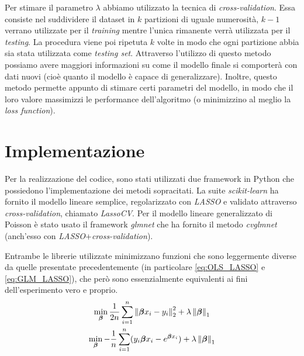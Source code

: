 Per stimare il parametro $\lambda$ abbiamo utilizzato la tecnica di \textit{cross-validation}. Essa consiste nel suddividere il 
dataset in $k$ partizioni di uguale numerosità, $k-1$ verrano utilizzate per il \textit{training} mentre l'unica rimanente 
verrà utilizzata per il \textit{testing}. La procedura viene poi ripetuta $k$ volte in modo che ogni partizione abbia sia 
stata utilizzata come \textit{testing set}. Attraverso l'utilizzo di questo metodo possiamo avere maggiori informazioni su 
come il modello finale si comporterà con dati nuovi (cioè quanto il modello è capace di generalizzare). Inoltre, questo 
metodo permette appunto di stimare certi parametri del modello, in modo che il loro valore massimizzi le performance 
dell'algoritmo (o minimizzino al meglio la \textit{loss function}).   

\section{Implementazione}

Per la realizzazione del codice, sono stati utilizzati due framework in Python che possiedono l'implementazione dei metodi
sopracitati. La suite \textit{scikit-learn} \cite{scikit-learn} ha fornito il modello lineare semplice, regolarizzato con 
\textit{LASSO} e validato attraverso \textit{cross-validation}, chiamato \textit{LassoCV}. Per il modello lineare 
generalizzato di Poisson è stato usato il framework \textit{glmnet} \cite{GLMNET} che ha fornito il metodo \textit{cvglmnet} 
(anch'esso con \textit{LASSO}+\textit{cross-validation}). 
\bigskip

Entrambe le librerie utilizzate minimizzano funzioni che sono leggermente diverse da quelle presentate precedentemente (in 
particolare \eqref{eq:OLS_LASSO} e \eqref{eq:GLM_LASSO}), che però sono essenzialmente equivalenti ai fini dell'esperimento 
vero e proprio. 
\begin{gather}
	\min_{\bm{\beta}} \frac{1}{2n}\sum_{i=1}^n \left\lVert\bm{\beta} x_i -y_i\right\rVert_{2}^2 + \lambda\left\lVert\bm{\beta}\right\rVert_1 	\\
	\min_{\bm{\beta}} -\frac{1}{n}\sum_{i=1}^n (y_i\bm{\beta} x_i - e^{\bm{\beta} x_i} ) + \lambda\left\lVert\bm{\beta}\right\rVert_1
\end{gather}

\newpage